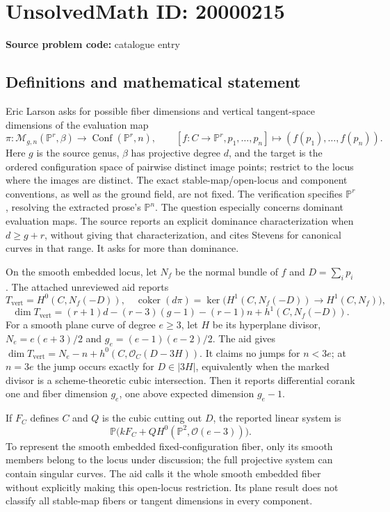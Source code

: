 \documentclass[11pt]{article}
\newcommand{\PP}{\mathbb{P}}
\begin{document}
\section*{UnsolvedMath ID: 20000215}
\textbf{Source problem code:} catalogue entry
\subsection{Definitions and mathematical statement}
Eric Larson asks for possible fiber dimensions and vertical tangent-space dimensions of the evaluation map
\[
\pi:\mathcal M_{g,n}(\PP^r,\beta)\longrightarrow\operatorname{Conf}(\PP^r,n),
\qquad [f:C\to\PP^r,p_1,\ldots,p_n]\longmapsto(f(p_1),\ldots,f(p_n)).
\]
Here $g$ is the source genus, $\beta$ has projective degree $d$, and the target is the ordered configuration space of pairwise distinct image points; restrict to the locus where the images are distinct. The exact stable-map/open-locus and component conventions, as well as the ground field, are not fixed. The verification specifies $\PP^r$, resolving the extracted prose's $\PP^n$. The question especially concerns dominant evaluation maps. The source reports an explicit dominance characterization when $d\ge g+r$, without giving that characterization, and cites Stevens for canonical curves in that range. It asks for more than dominance.

On the smooth embedded locus, let $N_f$ be the normal bundle of $f$ and $D=\sum_i p_i$. The attached unreviewed aid reports
\[
T_{\mathrm{vert}}=H^0(C,N_f(-D)),\quad
\operatorname{coker}(d\pi)=\ker\bigl(H^1(C,N_f(-D))\to H^1(C,N_f)\bigr),
\]
\[
\dim T_{\mathrm{vert}}=(r+1)d-(r-3)(g-1)-(r-1)n+h^1(C,N_f(-D)).
\]
For a smooth plane curve of degree $e\ge3$, let $H$ be its hyperplane divisor, $N_e=e(e+3)/2$ and $g_e=(e-1)(e-2)/2$. The aid gives $\dim T_{\mathrm{vert}}=N_e-n+h^0(C,\mathcal O_C(D-3H))$. It claims no jumps for $n<3e$; at $n=3e$ the jump occurs exactly for $D\in|3H|$, equivalently when the marked divisor is a scheme-theoretic cubic intersection. Then it reports differential corank one and fiber dimension $g_e$, one above expected dimension $g_e-1$.

If $F_C$ defines $C$ and $Q$ is the cubic cutting out $D$, the reported linear system is
\[
\PP\bigl(kF_C+QH^0(\PP^2,\mathcal O(e-3))\bigr).
\]
To represent the smooth embedded fixed-configuration fiber, only its smooth members belong to the locus under discussion; the full projective system can contain singular curves. The aid calls it the whole smooth embedded fiber without explicitly making this open-locus restriction. Its plane result does not classify all stable-map fibers or tangent dimensions in every component.
\end{document}
